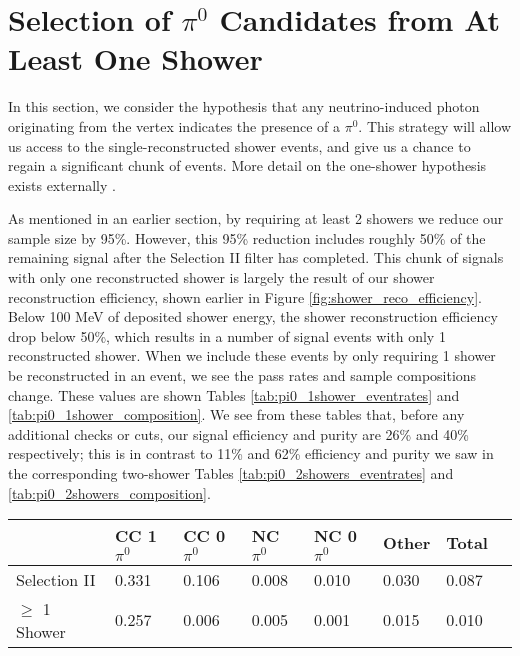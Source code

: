 \documentclass{article}
\begin{document}
\clearpage
\section{Selection of $\pi^0$ Candidates from At Least One Shower}
In this section, we consider the hypothesis that any neutrino-induced photon originating from the vertex indicates the presence of a $\pi^0$.  This strategy will allow us access to the single-reconstructed shower events, and give us a chance to regain a significant chunk of events. More detail on the one-shower hypothesis exists externally \cite{bib:timb_singleshower}.
\par As mentioned in an earlier section, by requiring at least 2 showers we reduce our sample size by 95\%.  However, this 95\% reduction includes roughly 50\% of the remaining signal after the Selection II filter has completed. This chunk of signals with only one reconstructed shower is largely the result of our shower reconstruction efficiency, shown earlier in Figure \ref{fig:shower_reco_efficiency}. Below 100 MeV of deposited shower energy, the shower reconstruction efficiency drop below 50\%, which results in a number of signal events with only 1 reconstructed shower. When we include these events by only requiring 1 shower be reconstructed in an event, we see the pass rates and sample compositions change.  These values are shown Tables \ref{tab:pi0_1shower_eventrates} and \ref{tab:pi0_1shower_composition}. We see from these tables that, before any additional checks or cuts, our signal efficiency and purity are 26\% and 40\% respectively; this is in contrast to 11\% and 62\% efficiency and purity we saw in the corresponding two-shower Tables \ref{tab:pi0_2showers_eventrates} and \ref{tab:pi0_2showers_composition}. 

\begin{table}[H]
\centering
{}
 \begin{tabular}{| l | l | l |l|l|l|l|l|}
 \hline
 & CC 1$\pi^0$ & CC 0$\pi^0$ & NC $\pi^0$ & NC 0$\pi^0$ & Other & Total \\ [0.1ex] \hline
Selection II & 0.331 & 0.106 & 0.008 & 0.010 & 0.030 & 0.087 \\
$\geq$ 1 Shower & 0.257 & 0.006 & 0.005 & 0.001 & 0.015 & 0.010 \\ \hline
\end{tabular}
\end{table}
\end{document}
